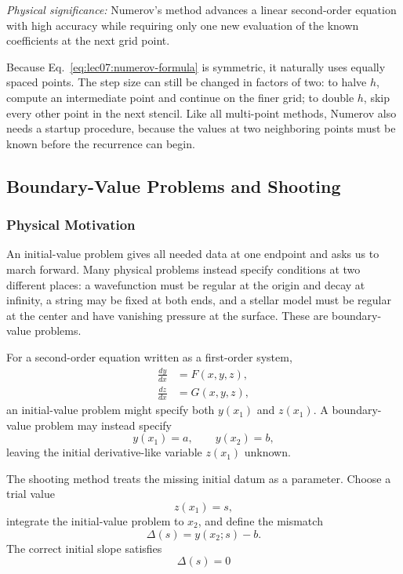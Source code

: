 \textit{Physical significance:} Numerov's method advances a linear
second-order equation with high accuracy while requiring only one new
evaluation of the known coefficients at the next grid point.

Because Eq.~\eqref{eq:lec07:numerov-formula} is symmetric, it naturally uses
equally spaced points. The step size can still be changed in factors of two:
to halve $h$, compute an intermediate point and continue on the finer grid;
to double $h$, skip every other point in the next stencil. Like all
multi-point methods, Numerov also needs a startup procedure, because the
values at two neighboring points must be known before the recurrence can
begin.

\subsection{Boundary-Value Problems and Shooting}
\label{subsec:lec07:boundary-value}

\subsubsection*{Physical Motivation}
An initial-value problem gives all needed data at one endpoint and asks us
to march forward. Many physical problems instead specify conditions at two
different places: a wavefunction must be regular at the origin and decay at
infinity, a string may be fixed at both ends, and a stellar model must be
regular at the center and have vanishing pressure at the surface. These are
boundary-value problems.

For a second-order equation written as a first-order system,
\begin{align}
    \frac{dy}{dx} &= F(x,y,z),
    \label{eq:lec07:bvp-system-y}\\
    \frac{dz}{dx} &= G(x,y,z),
    \label{eq:lec07:bvp-system-z}
\end{align}
an initial-value problem might specify both $y(x_1)$ and $z(x_1)$. A
boundary-value problem may instead specify
\begin{equation}
    y(x_1)=a,
    \qquad
    y(x_2)=b,
    \label{eq:lec07:bvp-simple-boundaries}
\end{equation}
leaving the initial derivative-like variable $z(x_1)$ unknown.

The shooting method treats the missing initial datum as a parameter. Choose
a trial value
\begin{equation}
    z(x_1)=s,
    \label{eq:lec07:shooting-trial-slope}
\end{equation}
integrate the initial-value problem to $x_2$, and define the mismatch
\begin{equation}
    \Delta(s)=y(x_2;s)-b.
    \label{eq:lec07:shooting-mismatch}
\end{equation}
The correct initial slope satisfies
\begin{equation}
    \boxed{\Delta(s)=0}
    \label{eq:lec07:shooting-root}
\end{equation}


